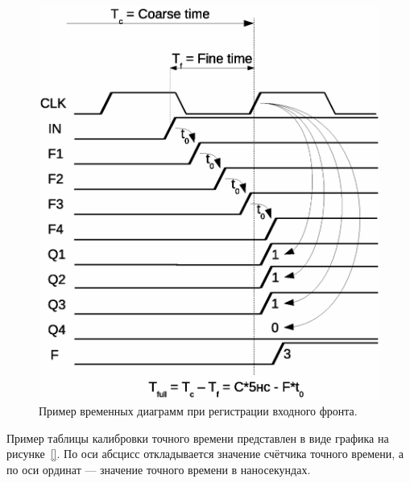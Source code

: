 \begin{figure}[H]
\includegraphics[width=1.0\textwidth]{pictures/TDC_diag.eps}
\caption{Пример временных диаграмм при регистрации входного фронта.}
\label{fig:TDCtimeDiag}
\end{figure}

Пример таблицы калибровки точного времени представлен в виде графика на рисунке~\ref{}. По оси абсцисс откладывается значение счётчика точного времени, а по оси ординат --- значение точного времени в наносекундах.
